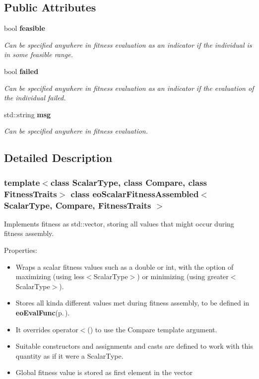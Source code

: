 \subsection*{Public Attributes}
\begin{CompactItemize}
\item 
bool {\bf feasible}\label{classeo_scalar_fitness_assembled_o0}

\begin{CompactList}\small\item\em Can be specified anywhere in fitness evaluation as an indicator if the individual is in some feasible range. \item\end{CompactList}\item 
bool {\bf failed}\label{classeo_scalar_fitness_assembled_o1}

\begin{CompactList}\small\item\em Can be specified anywhere in fitness evaluation as an indicator if the evaluation of the individual failed. \item\end{CompactList}\item 
std::string {\bf msg}
\begin{CompactList}\small\item\em Can be specified anywhere in fitness evaluation. \item\end{CompactList}\end{CompactItemize}


\subsection{Detailed Description}
\subsubsection*{template$<$class Scalar\-Type, class Compare, class Fitness\-Traits$>$ class eo\-Scalar\-Fitness\-Assembled$<$ Scalar\-Type, Compare, Fitness\-Traits $>$}

Implements fitness as std::vector, storing all values that might occur during fitness assembly. 

Properties:\begin{itemize}
\item Wraps a scalar fitness values such as a double or int, with the option of maximizing (using less$<$Scalar\-Type$>$) or minimizing (using greater$<$Scalar\-Type$>$).\item Stores all kinda different values met during fitness assembly, to be defined in {\bf eo\-Eval\-Func}{\rm (p.\,\pageref{classeo_eval_func})}.\item It overrides operator$<$() to use the Compare template argument.\item Suitable constructors and assignments and casts are defined to work with this quantity as if it were a Scalar\-Type.\item Global fitness value is stored as first element in the vector \end{itemize}




